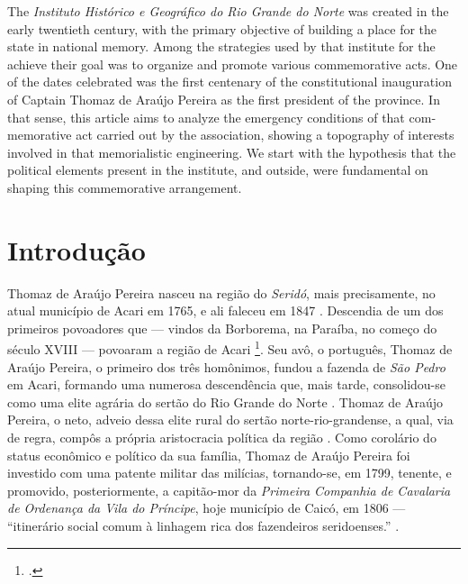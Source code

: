 \begin{refsection}
\begin{otherlanguage}{english}
    \begin{galoResumo}[Abstract]
        The \textit{Instituto Histórico e Geográfico do Rio Grande do Norte} was created in the early twentieth century, with the primary objective of building a place for the state in national memory. Among the strategies used by that institute for the achieve their goal was to organize and promote various commemorative acts. One of the dates celebrated was the first centenary of the constitutional inauguration of Captain Thomaz de Araújo Pereira as the first president of the province. In that sense, this article aims to analyze the emergency conditions of that commemorative act carried out by the association, showing a topography of interests involved in that memorialistic engineering. We start with the hypothesis that the political elements present in the institute, and outside, were fundamental on shaping this commemorative arrangement.
    \end{galoResumo}
    
    \end{otherlanguage}

    \section{Introdução}

    Thomaz de Araújo Pereira nasceu na região do \textit{Seridó}, mais precisamente, no atual município de Acari em 1765, e ali faleceu em 1847 \cite[p.~815]{Lyra1921Historia}. Descendia de um dos primeiros povoadores que --- vindos da Borborema, na Paraíba, no começo do século XVIII --- povoaram a região de Acari \footcite[p.~180]{DiscursoManoealDantas}. Seu avô, o português, Thomaz de Araújo Pereira, o primeiro dos três homônimos, fundou a fazenda de \textit{São Pedro} em Acari, formando uma numerosa descendência que, mais tarde, consolidou-se como uma elite agrária do sertão do Rio Grande do Norte \cite[p.~53]{Macedo2012Penultima}. Thomaz de Araújo Pereira, o neto, adveio dessa elite rural do sertão norte-rio-grandense, a qual, via de regra, compôs a própria aristocracia política da região \cite[p.~53]{Macedo2012Penultima}. Como corolário do status econômico e político da sua família, Thomaz de Araújo Pereira foi investido com uma patente militar das milícias, tornando-se, em 1799, tenente, e promovido, posteriormente, a capitão-mor da \textit{Primeira Companhia de Cavalaria de Ordenança da Vila do Príncipe}, hoje município de Caicó, em 1806 --- ``itinerário social comum à linhagem rica dos fazendeiros seridoenses.'' \cite[p.~54]{Macedo2012Penultima}.


\end{refsection}
